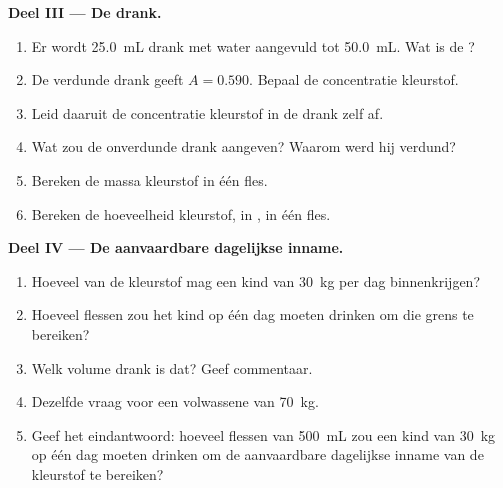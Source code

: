 \begin{problem}
\medskip
\noindent\textbf{Deel III --- De drank.}
\begin{enumerate}[resume]
  \item Er wordt \qty{25.0}{mL} drank met water aangevuld tot
        \qty{50.0}{mL}. Wat is de ?
  \item De verdunde drank geeft $A = 0.590$. Bepaal de concentratie
        kleurstof.
  \item Leid daaruit de concentratie kleurstof in de drank zelf af.
  \item Wat zou de onverdunde drank aangeven? Waarom werd hij verdund?
  \item Bereken de massa kleurstof in één fles.
  \item Bereken de hoeveelheid kleurstof, in , in één fles.
\end{enumerate}

\medskip
\noindent\textbf{Deel IV --- De aanvaardbare dagelijkse inname.}
\begin{enumerate}[resume]
  \item Hoeveel van de kleurstof mag een kind van \qty{30}{kg} per dag
        binnenkrijgen?
  \item Hoeveel flessen zou het kind op één dag moeten drinken om die
        grens te bereiken?
  \item Welk volume drank is dat? Geef commentaar.
  \item Dezelfde vraag voor een volwassene van \qty{70}{kg}.
  \item Geef het eindantwoord: hoeveel flessen van \qty{500}{mL} zou een
        kind van \qty{30}{kg} op één dag moeten drinken om de
        aanvaardbare dagelijkse inname van de kleurstof te bereiken?
\end{enumerate}
\end{problem}
